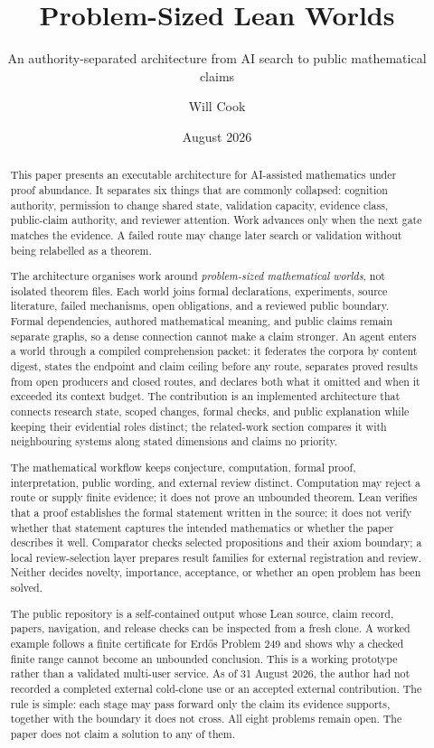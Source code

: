 \documentclass[10pt]{article}
\title{Problem-Sized Lean Worlds}
\subtitle{An authority-separated architecture from AI search to public mathematical claims}
\author{Will Cook}
\date{August 2026}
\begin{document}
\maketitle
\paperprovenance
\fontsize{9.2pt}{11pt}\selectfont

\begin{abstract}
This paper presents an executable architecture for AI-assisted mathematics
under proof abundance. It separates six things that are commonly collapsed:
cognition authority, permission to change shared state, validation capacity,
evidence class, public-claim authority, and reviewer attention. Work advances
only when the next gate matches the evidence. A failed route may change later
search or validation without being relabelled as a theorem.

The architecture organises work around \emph{problem-sized mathematical
worlds}, not isolated theorem files. Each world joins formal declarations,
experiments, source literature, failed mechanisms, open obligations, and a
reviewed public boundary. Formal dependencies, authored mathematical meaning,
and public claims remain separate graphs, so a dense connection cannot make a
claim stronger. An agent enters a world through a compiled comprehension
packet: it federates the corpora by content digest, states the endpoint and
claim ceiling before any route, separates proved results from open producers
and closed routes, and declares both what it omitted and when it exceeded its
context budget. The contribution is an implemented architecture that connects
research state, scoped changes, formal checks, and public explanation while
keeping their evidential roles distinct; the related-work section compares it
with neighbouring systems along stated dimensions and claims no priority.

The mathematical workflow keeps conjecture, computation, formal proof,
interpretation, public wording, and external review distinct. Computation may
reject a route or supply finite evidence; it does not prove an unbounded
theorem. Lean verifies that a proof establishes the formal statement written in
the source; it does not verify whether that statement captures the intended
mathematics or whether the paper describes it
well. Comparator checks selected propositions and their axiom boundary; a
local review-selection layer prepares result families for external
registration and review. Neither decides novelty, importance, acceptance, or
whether an open problem has been solved.

The public repository is a self-contained output whose Lean source, claim
record, papers, navigation, and release checks can be inspected from a fresh
clone. A worked example follows a finite certificate for Erd\H{o}s Problem 249
and shows why a checked finite range cannot become an unbounded conclusion.
This is a working prototype rather than a validated multi-user service. As of
31 August 2026, the author had not recorded a completed external cold-clone use
or an accepted external contribution.
The rule is simple: each stage may pass forward only the claim its evidence
supports, together with the boundary it does not cross. All eight problems
remain open.
The paper does not claim a solution to any of them.
\end{abstract}
\end{document}
